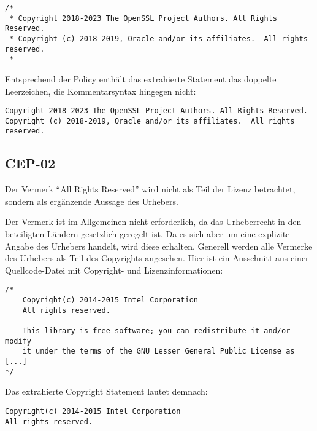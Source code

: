 \begin{lstlisting}[keepspaces=true]
/*
 * Copyright 2018-2023 The OpenSSL Project Authors. All Rights Reserved.
 * Copyright (c) 2018-2019, Oracle and/or its affiliates.  All rights reserved.
 *
\end{lstlisting}

Entsprechend der Policy enthält das extrahierte Statement das doppelte Leerzeichen, die Kommentarsyntax hingegen nicht:
\begin{lstlisting}[keepspaces=true]
Copyright 2018-2023 The OpenSSL Project Authors. All Rights Reserved.
Copyright (c) 2018-2019, Oracle and/or its affiliates.  All rights reserved.
\end{lstlisting}


\subsection{CEP-02}\label{subsec:cep-02}

Der Vermerk \enquote{All Rights Reserved} wird nicht als Teil der Lizenz betrachtet, sondern als ergänzende Aussage des Urhebers.

Der Vermerk ist im Allgemeinen nicht erforderlich, da das Urheberrecht in den beteiligten Ländern gesetzlich geregelt ist.
Da es sich aber um eine explizite Angabe des Urhebers handelt, wird diese erhalten.
Generell werden alle Vermerke des Urhebers als Teil des Copyrights angesehen.
Hier ist ein Ausschnitt aus einer Quellcode-Datei mit Copyright- und Lizenzinformationen:

\begin{lstlisting}[keepspaces=true]
/*
    Copyright(c) 2014-2015 Intel Corporation
    All rights reserved.

    This library is free software; you can redistribute it and/or modify
    it under the terms of the GNU Lesser General Public License as [...]
*/
\end{lstlisting}

Das extrahierte Copyright Statement lautet demnach:

\begin{lstlisting}[keepspaces=true]
Copyright(c) 2014-2015 Intel Corporation
All rights reserved.
\end{lstlisting}


